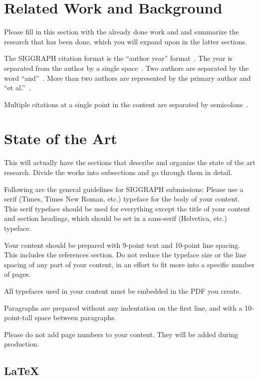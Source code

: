 \documentclass[tog]{acmsiggraph}
\begin{document}
\section{Related Work and Background}

Please fill in this section with the already done work and and summarize the research that has been done, which you will expand upon in the latter sections.

The SIGGRAPH citation format is the ``author year''
format~\cite{Pellacini:2005:LAH}. The year is separated from the
author by a single space~\cite{yee:2000:ssa}. Two authors are
separated by the word ``and''~\cite{parke:1996:CFA}. More than two
authors are represented by the primary author and ``et al.''~\cite{levoy:2000:TDM}.

Multiple citations at a single point in the content are separated by
semicolons~\cite{levoy:2000:TDM,sako:2001:SSB}.


\section{State of the Art}

This will actually have the sections that describe and organize the state of the art research.
Divide the works into subsections and go through them in detail.

Following are the general guidelines for SIGGRAPH submissions:
Please use a serif (Times, Times New Roman, etc.) typeface for the
body of your content. This serif typeface should be used for
everything except the title of your content and section headings,
which should be set in a sans-serif (Helvetica, etc.) typeface.

Your content should be prepared with 9-point text and 10-point line
spacing. This includes the references section. Do not reduce the
typeface size or the line spacing of any part of your content, in an
effort to fit more into a specific number of pages. 

All typefaces used in your content must be embedded in the PDF you
create. 

Paragraphs are prepared without any indentation on the first line, and
with a 10-point-tall space between paragraphs.

Please do not add page numbers to your content. They will be added
during production.






\subsection{\LaTeX}
\end{document}
